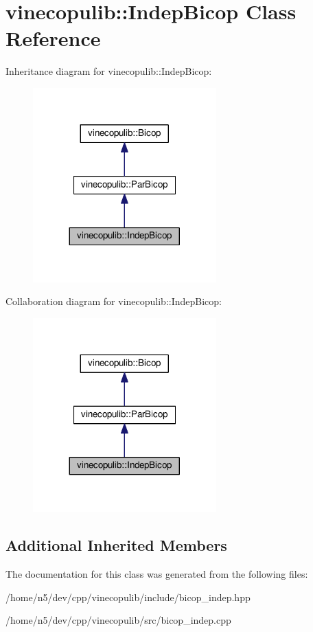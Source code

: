 \hypertarget{classvinecopulib_1_1_indep_bicop}{}\section{vinecopulib\+:\+:Indep\+Bicop Class Reference}
\label{classvinecopulib_1_1_indep_bicop}


Inheritance diagram for vinecopulib\+:\+:Indep\+Bicop\+:\nopagebreak
\begin{figure}[H]
\begin{center}
\leavevmode
\includegraphics[width=200pt]{classvinecopulib_1_1_indep_bicop__inherit__graph}
\end{center}
\end{figure}


Collaboration diagram for vinecopulib\+:\+:Indep\+Bicop\+:\nopagebreak
\begin{figure}[H]
\begin{center}
\leavevmode
\includegraphics[width=200pt]{classvinecopulib_1_1_indep_bicop__coll__graph}
\end{center}
\end{figure}
\subsection*{Additional Inherited Members}


The documentation for this class was generated from the following files\+:\begin{DoxyCompactItemize}
\item 
/home/n5/dev/cpp/vinecopulib/include/bicop\+\_\+indep.\+hpp\item 
/home/n5/dev/cpp/vinecopulib/src/bicop\+\_\+indep.\+cpp\end{DoxyCompactItemize}
